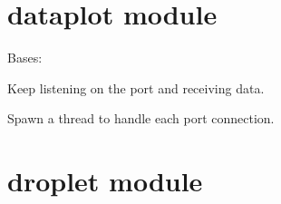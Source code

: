 \documentclass[letterpaper,10pt,openany,oneside,english]{sphinxmanual}
\begin{document}
\section{dataplot module}
\label{\detokenize{examples_rst/dataplot:module-dataplot}}\label{\detokenize{examples_rst/dataplot:dataplot-module}}\label{\detokenize{examples_rst/dataplot::doc}}

\begin{fulllineitems}
\label{\detokenize{examples_rst/dataplot:dataplot.DataPlot}}
Bases: 

\begin{fulllineitems}
\label{\detokenize{examples_rst/dataplot:dataplot.DataPlot.plot_data}}
\end{fulllineitems}


\begin{fulllineitems}
\label{\detokenize{examples_rst/dataplot:dataplot.DataPlot.recv_data}}
Keep listening on the port and receiving data.

\end{fulllineitems}


\begin{fulllineitems}
\label{\detokenize{examples_rst/dataplot:dataplot.DataPlot.run}}
Spawn a thread to handle each port connection.

\end{fulllineitems}


\end{fulllineitems}



\section{droplet module}
\label{\detokenize{examples_rst/droplet:module-droplet}}\label{\detokenize{examples_rst/droplet:droplet-module}}\label{\detokenize{examples_rst/droplet::doc}}
\end{document}
